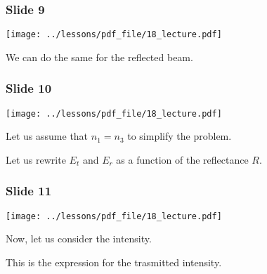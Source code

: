 \documentclass[../main/main.tex]{subfiles}
\begin{document}
\subsubsection*{Slide 9}

\begin{minipage}[]{0.5\linewidth}
\centering
\texttt{[image: ../lessons/pdf\_file/18\_lecture.pdf]}
\end{minipage}
\hspace{0.3cm}\vspace{0.3cm}
\begin{minipage}[c]{0.47\linewidth}

We can do the same for the reflected beam.

\end{minipage}

\subsubsection*{Slide 10}

\begin{minipage}[]{0.5\linewidth}
\centering
\texttt{[image: ../lessons/pdf\_file/18\_lecture.pdf]}
\end{minipage}
\hspace{0.3cm}\vspace{0.3cm}
\begin{minipage}[c]{0.47\linewidth}

Let us assume that \( n_1 = n_3 \) to simplify the problem.

Let us rewrite \( E_t \) and \( E_r \) as a function of the reflectance \( R \).

\end{minipage}

\subsubsection*{Slide 11}

\begin{minipage}[]{0.5\linewidth}
\centering
\texttt{[image: ../lessons/pdf\_file/18\_lecture.pdf]}
\end{minipage}
\hspace{0.3cm}\vspace{0.3cm}
\begin{minipage}[c]{0.47\linewidth}

Now, let us consider the intensity.

This is the expression for the trasmitted intensity.

\end{minipage}
\end{document}

